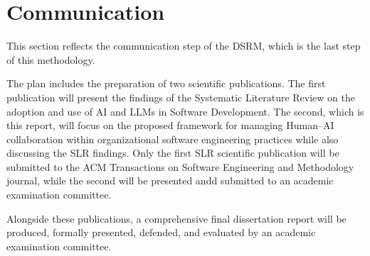 \section{Communication}
This section reflects the communication step of the DSRM, which is the last step of this methodology. 

The plan includes the preparation of two scientific publications. The first publication will present the findings of the Systematic Literature Review on the adoption and use of AI and LLMs in Software Development. The second, which is this report, will focus on the proposed framework for managing Human–AI collaboration within organizational software engineering practices while also discussing the SLR findings. Only the first SLR scientific publication will be submitted to the ACM Transactions on Software Engineering and Methodology journal, while the second will be presented andd submitted to an academic examination committee.

Alongside these publications, a comprehensive final dissertation report will be produced, formally presented, defended, and evaluated by an academic examination committee.